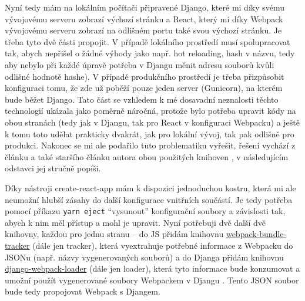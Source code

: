     Nyní tedy mám na lokálním počítači připravené Django, které mi díky svému vývojovému serveru zobrazí výchozí stránku a React, který mi díky Webpack vývojovému serveru zobrazí na odlišném portu také svou výchozí stránku. Je třeba tyto dvě části propojit. V případě lokálního prostředí musí spolupracovat tak, abych nepřišel o žádné výhody jako např. hot reloading, hash v názvu, tedy aby nebylo při každé úpravě potřeba v Djangu měnit adresu souborů kvůli odlišné hodnotě hashe). V případě produkčního prostředí je třeba přizpůsobit konfiguraci tomu, že zde už poběží pouze jeden server (Gunicorn), na kterém bude běžet Django. Tato část se vzhledem k mé dosavadní neznalosti těchto technologií ukázala jako poměrně náročná, protože bylo potřeba upravit kódy na obou stranách (tedy jak v Djangu, tak pro React v konfiguraci Webpacku) a ještě k tomu toto udělat prakticky dvakrát, jak pro lokální vývoj, tak pak odlišně pro produkci. Nakonec se mi ale podařilo tuto problematiku vyřešit, řešení vychází z článku \cite{webpack-loader2} a také staršího článku autora obou použitých knihoven \cite{webpack-loader1}, v následujícím odstavci jej stručně popíši.
    
    Díky nástroji create-react-app \cite{cra} mám k dispozici jednoduchou kostru, která mi ale neumožní hlubší zásahy do další konfigurace vnitřních součástí. Je tedy potřeba pomocí příkazu \verb|yarn eject| \enquote{vysunout} konfigurační soubory a závislosti tak, abych k nim měl přístup a mohl je upravit. Nyní potřebuji dvě další dvě knihovny, každou pro jednu stranu -- do JS přidám knihovnu \href{https://github.com/owais/webpack-bundle-tracker}{webpack-bundle-tracker} (dále jen tracker), která vyextrahuje potřebné informace z Webpacku do JSONu \cite{webpack-bundle-tracker} (např. názvy vygenerovaných souborů) a do Djanga přidám knihovnu \href{https://github.com/owais/django-webpack-loader}{django-webpack-loader} (dále jen loader), která tyto informace bude konzumovat a umožní použít vygenerované soubory Webpackem v Djangu \cite{django-webpack-loader}. Tento JSON soubor bude tedy propojovat Webpack s Djangem.
    
